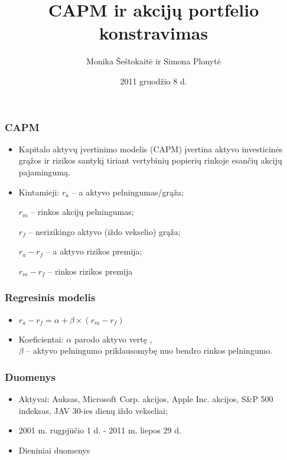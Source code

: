 \documentclass[utf8,hyperref={unicode},xcolor=dvipsnames]{beamer}
\title[CAPM]{CAPM ir akcijų portfelio konstravimas}
\author[ ]{Monika Šeštokaitė ir Simona Plonytė}
\institute[Vilnius University] {
    
    Vilniaus Universitetas
    \and
    
   Matematikos ir informatikos fakultetas
\and
Ekonometrinės analizės katedra
 }
\date{2011 gruodžio 8 d.}
\theoremstyle{change}\newtheorem{teorema}{Teiginys}
\theoremstyle{change}\newtheorem{salyga}{}
\begin{document}
\begin{frame}
    \titlepage
\end{frame}

\begin{frame}
    \frametitle{CAPM} 
    \begin{itemize}
	\item Kapitalo aktyvų įvertinimo modelis (CAPM) įvertina aktyvo investicinės grąžos ir rizikos santykį tiriant vertybinių popierių rinkoje esančių akcijų pajamingumą.
    \item Kintamieji: $r_a$ -- a aktyvo pelningumas/grąža; 

$r_m$ -- rinkos akcijų pelningumas; 

$r_f$ -- nerizikingo aktyvo (iždo vekselio) grąža; 

$r_a-r_f$ -- a aktyvo rizikos premija; 

$r_m - r_f$ -- rinkos rizikos premija
    \end{itemize}
\end{frame}
\begin{frame}
    \frametitle{Regresinis modelis} 
    \begin{itemize}
	\item $r_a - r_f = \alpha + \beta \times (r_m - r_f)$
	\item Koeficientai: $ \alpha $ parodo aktyvo vertę ,\\ $ \beta $ -- aktyvo pelningumo priklausomybę nuo bendro rinkos pelningumo.
	
\begin{comment}	
	
\item $\beta = \frac{\sigma_{am}}{\sigma^2_m}$
\item Čia $\sigma_{am}$ -- a aktyvo ir rinkos rizikos premijų kovariacija; 

$\sigma^2_m$ -- rinkos rizikos premijos dispersija
\end{comment}

    \end{itemize}
\end{frame}
\begin{frame}
    \frametitle{Duomenys} 
    \begin{itemize}
 	\item Aktyvai: Auksas, Microsoft Corp. akcijos, Apple Inc. akcijos, S\&P 500 indeksas, JAV 30-ies dienų iždo vekseliai;
	\item 2001 m. rugpjūčio 1 d. - 2011 m. liepos 29 d.
	\item Dieniniai duomenys

    \end{itemize}
\end{frame}
\end{document}
